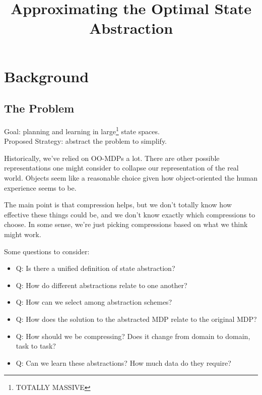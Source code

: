 \documentclass[11pt]{amsart}
\title{Approximating the Optimal State Abstraction}
\author{}
\date{}                                           %
\begin{document}
\maketitle

\begin{abstract}

\end{abstract}


\newpage
\section{Background}

\subsection{The Problem}
\begin{mdframed}
\vspace{1mm}
Goal: planning and learning in large\footnote{TOTALLY MASSIVE} state spaces. \\
Proposed Strategy: abstract the problem to simplify.
\end{mdframed}

\vspace{4mm}
Historically, we've relied on OO-MDPs a lot. There are other possible representations one might consider to collapse our representation of the real world. Objects seem like a reasonable choice given how object-oriented the human experience seems to be.


The main point is that compression helps, but we don't totally know how effective these things could be, and we don't know exactly which compressions to choose. In some sense, we're just picking compressions based on what we think might work.

Some questions to consider:
\begin{itemize}
\item Q: Is there a unified definition of state abstraction?
\item Q: How do different abstractions relate to one another?
\item Q: How can we select among abstraction schemes?
\item Q: How does the solution to the abstracted MDP relate to the original MDP?
\item Q: How should we be compressing? Does it change from domain to domain, task to task?
\item Q: Can we learn these abstractions? How much data do they require?
\end{itemize}
\end{document}
